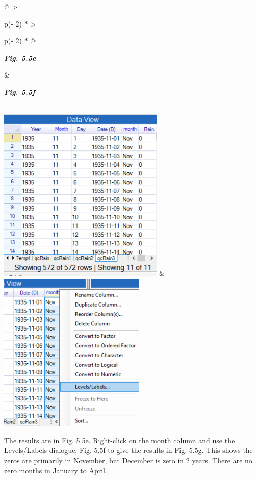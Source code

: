 \documentclass[
  letterpaper,
  DIV=11,
  numbers=noendperiod]{scrreprt}
\begin{document}
\begin{longtable}[]{@{}
  >{\raggedright\arraybackslash}p{(\columnwidth - 2\tabcolsep) * }
  >{\raggedright\arraybackslash}p{(\columnwidth - 2\tabcolsep) * }@{}}
\toprule\noalign{}
\begin{minipage}[b]{\linewidth}\raggedright
\textbf{\emph{Fig. 5.5e}}
\end{minipage} & \begin{minipage}[b]{\linewidth}\raggedright
\textbf{\emph{Fig. 5.5f}}
\end{minipage} \\
\midrule\noalign{}
\endhead
\bottomrule\noalign{}
\endlastfoot
\includegraphics[width=3.11878in,height=3.30328in]{figures/Fig5.5e.png}
&
\includegraphics[width=2.75836in,height=3.01454in]{figures/Fig5.5f.png} \\
\end{longtable}

The results are in Fig. 5.5e. Right-click on the month column and use
the Levels/Labels dialogue, Fig. 5.5f to give the results in Fig. 5.5g.
This shows the zeros are primarily in November, but December is zero in
2 years. There are no zero months in January to April.
\end{document}
